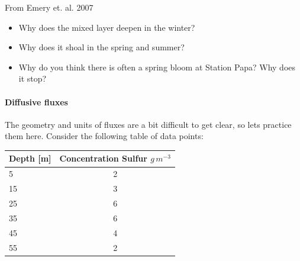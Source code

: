 From Emery et. al. 2007

\begin{itemize}
  \item Why does the mixed layer deepen in the winter?

  \item Why does it shoal in the spring and summer?

  \item Why do you think there is often a spring bloom at Station Papa? Why does it stop?
\end{itemize}



\paragraph{Diffusive fluxes}

The geometry and units of fluxes are a bit difficult to get clear, so lets practice them here. Consider the following table of data points:

\begin{tabular}{l|c}
Depth [m]  & Concentration Sulfur $g\, m^{-3}$\\
  \hline
5	& 2\\
15	& 3\\
25	& 6\\
35	& 6\\
45	& 4\\
55	& 2\\
\end{tabular}

